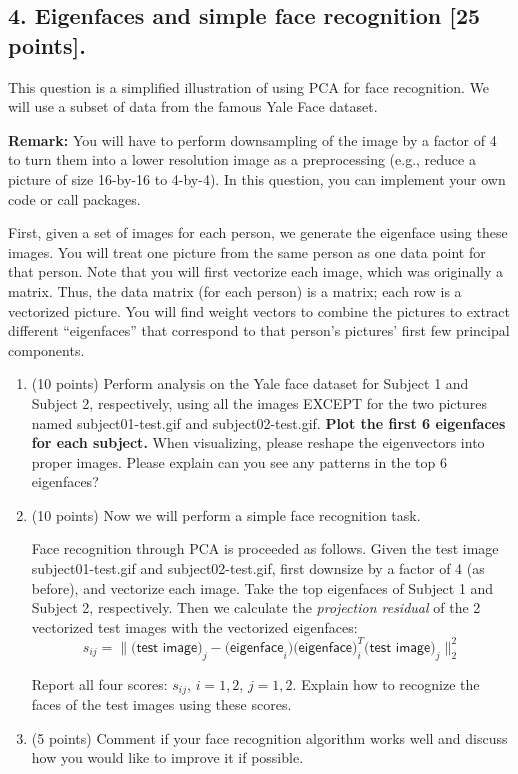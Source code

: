 \documentclass[twoside,10pt]{article}
\begin{document}
 \clearpage

\subsection*{4. Eigenfaces and simple face recognition [25 points].}

This question is a simplified illustration of using PCA for face recognition. We will use a subset of data from the famous Yale Face dataset. 

\vspace{.1in}
\noindent
{\bf Remark:} You will have to perform downsampling of the image by a factor of 4 to turn them into a lower resolution image as a preprocessing (e.g., reduce a picture of size 16-by-16 to 4-by-4). In this question, you can implement your own code or call packages. 

First, given a set of images for each person, we generate the eigenface using these images. You will treat one picture from the same person as one data point for that person. Note that you will first vectorize each image, which was originally a matrix. Thus, the data matrix (for each person) is a matrix; each row is a vectorized picture. You will find weight vectors to combine the pictures to extract different ``eigenfaces'' that correspond to that person's pictures' first few principal components. 


\begin{enumerate}

\item (10 points) Perform analysis on the Yale face dataset for Subject 1 and Subject 2, respectively, using all the images EXCEPT for the two pictures named \textsf{subject01-test.gif} and \textsf{subject02-test.gif}. {\bf Plot the first 6 eigenfaces for each subject.} When visualizing, please reshape the eigenvectors into proper images. Please explain can you see any patterns in the top 6 eigenfaces?

\item (10 points) Now we will perform a simple face recognition task. 

Face recognition through PCA is proceeded as follows. Given the test image \textsf{subject01-test.gif} and \textsf{subject02-test.gif}, first downsize by a factor of 4 (as before), and vectorize each image. Take the top eigenfaces of Subject 1 and Subject 2, respectively. Then we calculate the {\it projection residual} of the 2 vectorized test images with the vectorized eigenfaces:
\[s_{ij} = \|\textsf{(test image)}_j - \textsf{(eigenface}_i)\textsf{(eigenface})_i^T \textsf{(test image)}_j\|_2^2\]

Report all four scores: $s_{ij}$, $i = 1, 2$, $j = 1, 2.$ Explain how to recognize the faces of the test images using these scores. 

\item (5 points)
 Comment if your face recognition algorithm works well and discuss how you would like to improve it if possible.

\end{enumerate}
\end{document}

